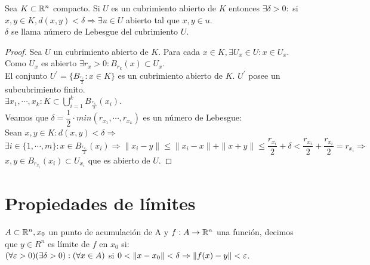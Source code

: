 \clearpage

\begin{prop}
  Sea $K \subset \mathbb{R}^n$ compacto. Si $U$ es un cubrimiento abierto de $K$ entonces $\exists \delta > 0 :$ si $x, y \in K, d(x, y) < \delta \Rightarrow \exists u \in U$ abierto tal que $x, y \in u$. \\
  $\delta$ se llama número de Lebesgue del cubrimiento $U$.
  \begin{proof}
    Sea $U$ un cubrimiento abierto de $K$. Para cada $x \in K, \exists U_x \in U : x \in U_x$. Como $U_x$ es abierto $\exists r_x > 0 : B_{r_k}(x) \subset U_x$. \\
    El conjunto $U^{\prime} = \{ B_{\frac{r_x}{2}} : x \in K \}$ es un cubrimiento abierto de $K$. $U^{\prime}$ posee un subcubrimiento finito. \\
    $\exists x_1, \cdots, x_k : K \subset \bigcup_{i = 1}^{k} B_{\frac{r_{x_i}}{2}}(x_i)$. \\
    Veamos que $\delta = \dfrac{1}{2} \cdot min(r_{x_1}, \cdots, r_{x_k})$ es un número de Lebesgue: \\
    Sean $x, y \in K : d(x,y) < \delta \Rightarrow$ \\
    $\exists i \in \{1, \cdots, m\} : x \in B_{\frac{r_{x_i}}{2}}(x_i) \Rightarrow \|x_i - y\| \leq \|x_i - x\| + \|x+y\| \leq \dfrac{r_{x_i}}{2} + \delta < \dfrac{r_{x_i}}{2} + \dfrac{r_{x_i}}{2} = r_{x_i} \Rightarrow$ \\
    $x, y \in B_{r_{x_i}}(x_i) \subset U_{x_i}$ que es abierto de $U$.
  \end{proof}
\end{prop}

\section{Propiedades de límites}

\begin{definition}[Límite]
  $A \subset \mathbb{R}^n, x_0$ un punto de acumulación de A y $f: A \to \mathbb{R}^n$ una función, decimos que $y \in R^n$ es límite de $f$ en $x_0$ si: \\
  $(\forall \varepsilon > 0)(\exists \delta>0) : (\forall x \in A)$ si $0 < \|x - x_0\| < \delta \Rightarrow \|f(x) - y\| < \varepsilon$.
\end{definition}

